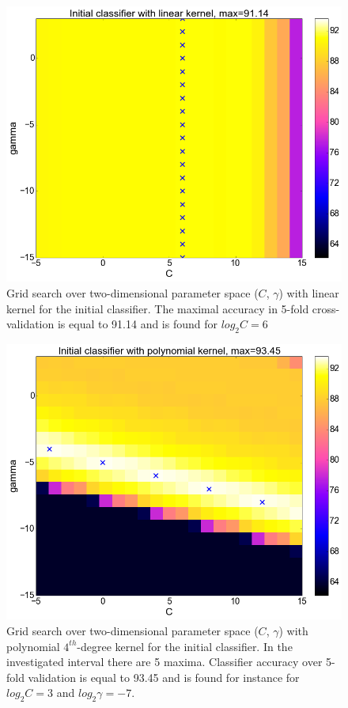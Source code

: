 \begin{center}
\begin{figure}
	\centering
  \includegraphics[width=1\textwidth]{plots/init_linear}
  \caption{Grid search over two-dimensional parameter space ($C$, $\gamma$) with linear kernel for the initial classifier. The maximal accuracy in 5-fold cross-validation is equal to 91.14 and is found for $log_{2}C=6$}
  \label{fig:initial_linear}
\end{figure}
\begin{figure}
\centering
  \includegraphics[width=1\textwidth]{plots/init_poly}
  \caption{Grid search over two-dimensional parameter space ($C$, $\gamma$) with polynomial $4^{th}$-degree kernel for the initial classifier. In the investigated interval there are 5 maxima. Classifier accuracy over 5-fold validation is equal to 93.45 and is found for instance for $log_{2}C=3$ and $log_{2}\gamma=-7$.}
  \label{fig:initial_poly}
\end{figure}


\end{center}
